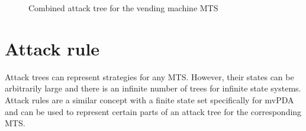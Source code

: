 \begin{figure}[H]
  \centering
{}
  \caption{Combined attack tree for the vending machine MTS}
  \label{fig:vending-combined-attack-tree}
\end{figure}

\section{Attack rule}

Attack trees can represent strategies for any MTS.
However, their states can be arbitrarily large and there
is an infinite number of trees for infinite state systems.
Attack rules are a similar concept with a finite state set
specifically for mvPDA and
can be used to represent certain parts of an attack tree
for the corresponding MTS.

